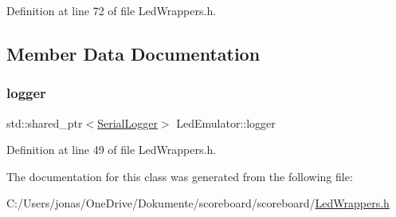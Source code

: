 Definition at line 72 of file Led\+Wrappers.\+h.



\subsection{Member Data Documentation}
\mbox{\label{class_led_emulator_adfd43bb9a851945ec10daed16907b36c}} 
\subsubsection{\texorpdfstring{logger}{logger}}
{\footnotesize\ttfamily std\+::shared\+\_\+ptr$<$\hyperlink{class_serial_logger}{Serial\+Logger}$>$ Led\+Emulator\+::logger}



Definition at line 49 of file Led\+Wrappers.\+h.



The documentation for this class was generated from the following file\+:\begin{DoxyCompactItemize}
\item 
C\+:/\+Users/jonas/\+One\+Drive/\+Dokumente/scoreboard/scoreboard/\hyperlink{_led_wrappers_8h}{Led\+Wrappers.\+h}\end{DoxyCompactItemize}
